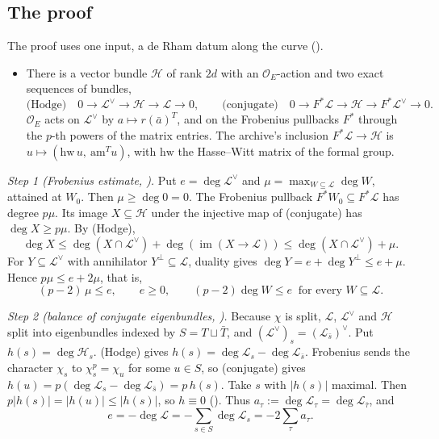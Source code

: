 \documentclass[11pt]{article}
\theoremstyle{remark}
\begin{document}
\subsection{The proof}

The proof uses one input, a de Rham datum along the curve ().
\begin{itemize}[nosep]
\item[(D)] There is a vector bundle $\mathcal H$ of rank $2d$ with an $\mathcal O_E$-action and two exact sequences of bundles,
\[
\text{(Hodge)}\quad0\to\mathcal L^\vee\to\mathcal H\to\mathcal L\to0,\qquad\text{(conjugate)}\quad0\to F^*\mathcal L\to\mathcal H\to F^*\mathcal L^\vee\to0 .
\]
$\mathcal O_E$ acts on $\mathcal L^\vee$ by $a\mapsto r(\bar a)^{T}$, and on the Frobenius pullbacks $F^*$ through the $p$-th powers of the matrix entries. The archive's inclusion $F^*\mathcal L\to\mathcal H$ is $u\mapsto(\mathrm{hw}\,u,\ \mathrm{am}^{T}u)$, with $\mathrm{hw}$ the Hasse--Witt matrix of the formal group.
\end{itemize}

\noindent\emph{Step 1 (Frobenius estimate, ).} Put $e=\deg\mathcal L^\vee$ and $\mu=\max_{W\subseteq\mathcal L}\deg W$, attained at $W_0$. Then $\mu\ge\deg0=0$. The Frobenius pullback $F^*W_0\subseteq F^*\mathcal L$ has degree $p\mu$. Its image $X\subseteq\mathcal H$ under the injective map of (conjugate) has $\deg X\ge p\mu$. By (Hodge),
\[
\deg X\le\deg(X\cap\mathcal L^\vee)+\deg(\operatorname{im}(X\to\mathcal L))\le\deg(X\cap\mathcal L^\vee)+\mu .
\]
For $Y\subseteq\mathcal L^\vee$ with annihilator $Y^\perp\subseteq\mathcal L$, duality gives $\deg Y=e+\deg Y^\perp\le e+\mu$. Hence $p\mu\le e+2\mu$, that is,
\[
(p-2)\,\mu\le e,\qquad e\ge0,\qquad(p-2)\deg W\le e\ \text{ for every }W\subseteq\mathcal L .
\]

\noindent\emph{Step 2 (balance of conjugate eigenbundles, ).} Because $\chi$ is split, $\mathcal L$, $\mathcal L^\vee$ and $\mathcal H$ split into eigenbundles indexed by $S=T\sqcup\bar T$, and $(\mathcal L^\vee)_s=(\mathcal L_{\bar s})^\vee$. Put $h(s)=\deg\mathcal H_s$. (Hodge) gives $h(s)=\deg\mathcal L_s-\deg\mathcal L_{\bar s}$. Frobenius sends the character $\chi_s$ to $\chi_s^p=\chi_u$ for some $u\in S$, so (conjugate) gives $h(u)=p(\deg\mathcal L_s-\deg\mathcal L_{\bar s})=p\,h(s)$. Take $s$ with $\lvert h(s)\rvert$ maximal. Then $p\lvert h(s)\rvert=\lvert h(u)\rvert\le\lvert h(s)\rvert$, so $h\equiv0$ (). Thus $a_\tau:=\deg\mathcal L_\tau=\deg\mathcal L_{\bar\tau}$, and
\[
e=-\deg\mathcal L=-\sum_{s\in S}\deg\mathcal L_s=-2\sum_{\tau}a_\tau .
\]
\end{document}
